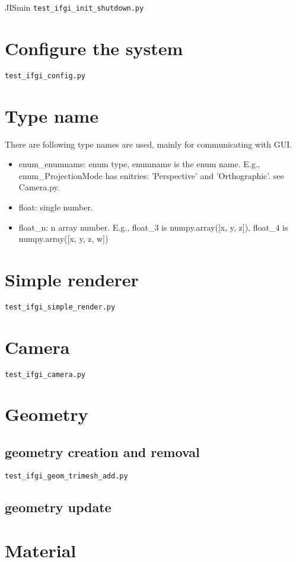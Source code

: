 \documentclass[12pt]{scrartcl}\usepackage{CJK}
\begin{document}
\begin{CJK*}[dnp]{JIS}{min}
\verb|test_ifgi_init_shutdown.py|

\section{Configure the system}

\verb|test_ifgi_config.py|

\section{Type name}

There are following type names are used, mainly for communicating with
GUI.
\begin{itemize}
 \item enum_enumname: enum type, enumname is the enum name. E.g.,
       enum_ProjectionMode has enitries: 'Perspective' and
       'Orthographic'. see Camera.py.
 \item float: single number.
 \item float_n: n array number. E.g., float_3 is numpy.array([x, y, z]),
       float_4 is numpy.array([x, y, z, w])
\end{itemize}

\section{Simple renderer}

\verb|test_ifgi_simple_render.py|

\section{Camera}

\verb|test_ifgi_camera.py|

\section{Geometry}

\subsection{geometry creation and removal}
\verb|test_ifgi_geom_trimesh_add.py|

\subsection{geometry update}

\section{Material}


\end{CJK*}
\end{document}
